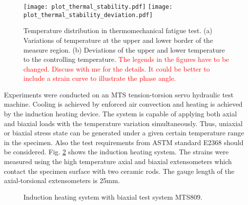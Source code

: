 \documentclass[preprint,5p,twocolumn,11pt,sort&compress]{elsarticle}
\newcommand{\marked}[1]{\textcolor{red}{#1}}
\begin{document}
\begin{figure}[!htp]
\texttt{[image: plot\_thermal\_stability.pdf]}
\texttt{[image: plot\_thermal\_stability\_deviation.pdf]}
\caption{Temperature distribution in thermomechanical fatigue test. (a) Variations of temperature at the upper and lower border of the measure region. (b) Deviations of the upper and lower temperature to the controlling temperature. \marked{The legends in the figures have to be changed. Discuss with me for the details. It could be better to include a strain curve to illustrate the phase angle.}}
\label{Fig:Temp-Distr}
\end{figure}

Experiments were conducted on an MTS tension-torsion servo hydraulic test machine. Cooling is achieved by enforced air convection and heating is achieved by the induction heating device. The system is capable of applying both axial and biaxial loads with the temperature variation simultaneously. Thus, uniaxial or biaxial stress state can be generated under a given certain temperature range in the specimen. Also the test requirements from ASTM standard E2368 \cite{ASTM2014a} should be considered. Fig. \ref{Fig:Equipments} shows the induction heating system. The strains were measured using the high temperature axial and biaxial extensometers which contact the specimen surface with two ceramic rods. The gauge length of the axial-torsional extensometers is 25mm.

\begin{figure}[!htp]
\caption{Induction heating system with biaxial test system MTS809.}
\label{Fig:Equipments}
\end{figure}
\end{document}
